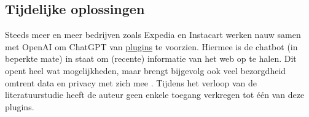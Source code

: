 \subsection{Tijdelijke oplossingen}
Steeds meer en meer bedrijven zoals Expedia en Instacart werken nauw samen met OpenAI om ChatGPT van \href{https://openai.com/blog/chatgpt-plugins}{plugins} te voorzien. Hiermee is de chatbot (in beperkte mate) in staat om (recente) informatie van het web op te halen. Dit opent heel wat mogelijkheden, maar brengt bijgevolg ook veel bezorgdheid omtrent data en privacy met zich mee \autocite{WillKnight2023}. Tijdens het verloop van de literatuurstudie heeft de auteur geen enkele toegang verkregen tot één van deze plugins.
